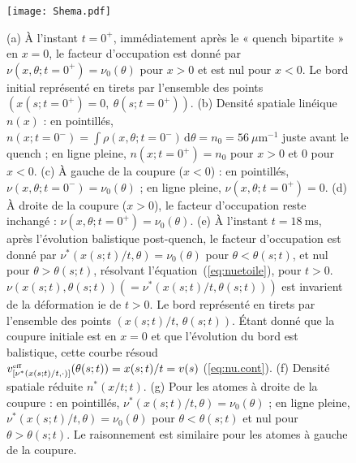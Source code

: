 \begin{figure}[!htb]
	\centering
	\texttt{[image: Shema.pdf]}
	\caption{
(a) À l'instant $t = 0^+$, immédiatement après le « quench bipartite » en $x = 0$, le facteur d'occupation est donné par $\nu(x, \theta ; t = 0^+) = \nu_0(\theta)$ pour $x > 0$ et est nul pour $x < 0$. Le bord initial représenté en tirets par l'ensemble des points $(x(s; t = 0^+) = 0,\ \theta(s; t = 0^+))$.
(b) Densité spatiale linéique $n(x)$ : en pointillés, $n(x; t = 0^-) = \int \rho(x, \theta; t = 0^-) \, \mathrm{d}\theta = n_0 = 56~\mu\mathrm{m}^{-1}$ juste avant le quench ; en ligne pleine, $n(x; t = 0^+) = n_0$ pour $x > 0$ et $0$ pour $x < 0$.
(c) À gauche de la coupure ($x < 0$) : en pointillés, $\nu(x, \theta ; t = 0^-) = \nu_0(\theta)$ ; en ligne pleine, $\nu(x, \theta ; t = 0^+) = 0$.
(d) À droite de la coupure ($x > 0$), le facteur d'occupation reste inchangé : $\nu(x, \theta ; t = 0^+) = \nu_0(\theta)$.
(e) À l'instant $t = 18~\mathrm{ms}$, après l'évolution balistique post-quench, le facteur d'occupation est donné par $\nu^\ast(x(s;t)/t, \theta) = \nu_0(\theta)$ pour $\theta < \theta(s;t)$, et nul pour $\theta > \theta(s;t)$, résolvant l'équation~(\ref{eq:nuetoile}), pour $t>0$. $\nu(x(s;t), \theta(s;t))(=\nu^\ast(x(s;t)/t, \theta(s;t)))$ est invarient de la déformation ie de $t>0$.  Le bord représenté en tirets par l'ensemble des points $(x(s; t)/t,\, \theta(s; t))$. Étant donné que la coupure initiale est en $x = 0$ et que l’évolution du bord est balistique, cette courbe résoud $v^{\mbox{\tiny eff}}_{[\nu^\ast(x(s; t)/t, \cdot) ]}(\theta(s; t)) = x(s; t)/t = v(s)$ (\ref{eq:nu.cont}).
(f) Densité spatiale réduite $n^\ast(x/t; t)$.
(g) Pour les atomes à droite de la coupure : en pointillés, $\nu^\ast(x(s;t)/t, \theta) = \nu_0(\theta)$ ; en ligne pleine, $\nu^\ast(x(s;t)/t, \theta) = \nu_0(\theta)$ pour $\theta < \theta(s;t)$ et nul pour $\theta > \theta(s;t)$. Le raisonnement est similaire pour les atomes à gauche de la coupure.
}
	\label{fig:BiPart.coupure1}
	
\end{figure}


